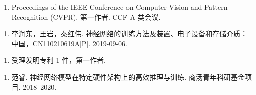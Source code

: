 \documentclass[
]{shtthesis}
\begin{document}
\begin{publications*}
\begin{enumerate}
  \item Proceedings of the IEEE Conference on Computer Vision and Pattern Recognition (CVPR). 第一作者. CCF-A 类会议.
\end{enumerate}
\end{publications*}

\begin{patterns}
\begin{enumerate}
  \item 李润东，王岩，秦红伟. 神经网络的训练方法及装置、电子设备和存储介质：中国，CN110210619A[P]. 2019-09-06.
\end{enumerate}
\end{patterns}

\begin{patterns*}
\begin{enumerate}
  \item 受理发明专利 1 件，第一作者.
\end{enumerate}
\end{patterns*}

\begin{projects}
\begin{enumerate}
  \item 范睿. 神经网络模型在特定硬件架构上的高效推理与训练. 商汤青年科研基金项目. 2018--2020.
\end{enumerate}
\end{projects}
\end{document}
